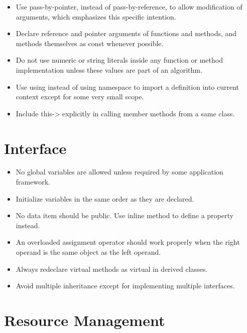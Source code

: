 \documentclass[a4paper,twoside,openright,makeidx,12pt]{report}
\begin{document}
\begin{itemize}
\item Use pass-by-pointer, instead of pass-by-reference, to allow modification of arguments, which emphasizes this specific intention. 
\item Declare reference and pointer arguments of functions and methods, and methods themselves as const whenever possible.
\item Do not use numeric or string literals inside any function or method implementation unless these values are part of an algorithm. 
\item Use  using  instead of  using namespace  to import a definition into current context except for some very small scope.
\item Include this-> explicitly in calling member methods from a same class.
\end{itemize}

\section{Interface}

\begin{itemize}
\item No global variables are allowed unless required by some application framework. 
\item Initialize variables in the same order as they are declared. 
\item No data item should be public. Use inline method to define a property instead. 
\item An overloaded assignment operator should work properly when the right operand is the same object as the left operand. 
\item Always redeclare virtual methods as virtual in derived classes. 
\item Avoid multiple inheritance except for implementing multiple interfaces.
\end{itemize}

\section{Resource Management}
\end{document}
